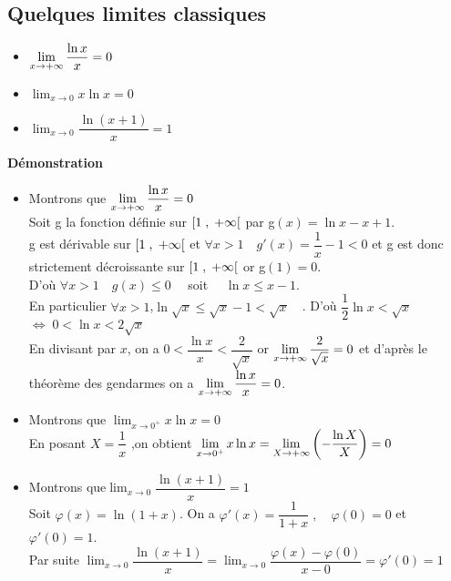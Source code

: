 \subsection*{Quelques limites classiques}

\begin{property}
\begin{itemize}
\item $\displaystyle \lim_{x \to +\infty}\dfrac{\ln x}{x}=0 $
\item   $ \displaystyle\lim_{x \to 0}x\ln x=0 $  
\item  $ \displaystyle\lim_{x \to 0} \dfrac{\ln(x+1)}{x}=1 $
\end{itemize}
\end{property}

\textbf{Démonstration}
\begin{itemize}
\item   Montrons que $ \displaystyle\lim_{x \to +\infty}\dfrac{\ln x}{x}=0 $  \\  
 Soit  g la fonction définie sur $ \left[1 \;,\; +\infty\right[ $ \; par\;  g$ (x)=\ln x- x+1 $.\\ g est dérivable sur $ \left[1 \;,\; +\infty\right[ $\; et                                     \;  $ \forall x> 1  \quad g'(x)=\dfrac{1}{x}-1< 0 $\; et g est donc strictement  décroissante sur  $ \left[1 \;,\; +\infty\right[ $\; or\;  g$ (1)=0 $.\\ 
 D'où \;$\forall x> 1\quad g(x)\leq  0 \quad$\; soit \; $\quad \ln x \leq x-1 $.\\
 En particulier \; $ \forall x> 1 $,\quad  $ \ln \sqrt{x} \leq \sqrt{x}-1 <\sqrt{x}\quad$. D'où \;$\dfrac{1}{2}\ln x <\sqrt{x}$ \;$ \Leftrightarrow \;0< \ln x <2\sqrt{x}$\\
 En divisant par $ x $, on a \;$ 0< \dfrac{\ln x}{x} < \dfrac{2}{\sqrt{x}}$\; or $ \displaystyle\lim_{x \to +\infty }\dfrac{2}{\sqrt{x}}=0 $  et d'après le théorème des gendarmes on a $ \displaystyle\lim_{x \to +\infty}\dfrac{\ln x}{x}=0 $.\\
 
\item  Montrons que\; $ \displaystyle\lim_{x \to 0^{+}}x\ln x=0 $\\
 En posant $ X=\dfrac{1}{x} $ ,\;on obtient $ \displaystyle\lim_{x \to 0^{+}}x\ln x  =\displaystyle\lim_{X \to +\infty}\left(-\dfrac{\ln X}{X}\right) =0 $
 
 \item  Montrons que\;$ \displaystyle\lim_{x \to 0} \dfrac{\ln(x+1)}{x}=1 $\\
  Soit $ \varphi (x)=\ln (1+x)$.\; On a \; $ \varphi'(x)=\dfrac{1}{1+x} \;,\quad  \varphi(0)=0 $ \;et \; $ \varphi'(0)=1 $.\\
Par suite \quad   $\displaystyle \lim_{x \to 0}  \dfrac{\ln(x+1)}{x} =\displaystyle\lim_{x \to 0}  \dfrac{\varphi(x)-\varphi(0)}{x-0} = \varphi'(0)=1$
\end{itemize}


